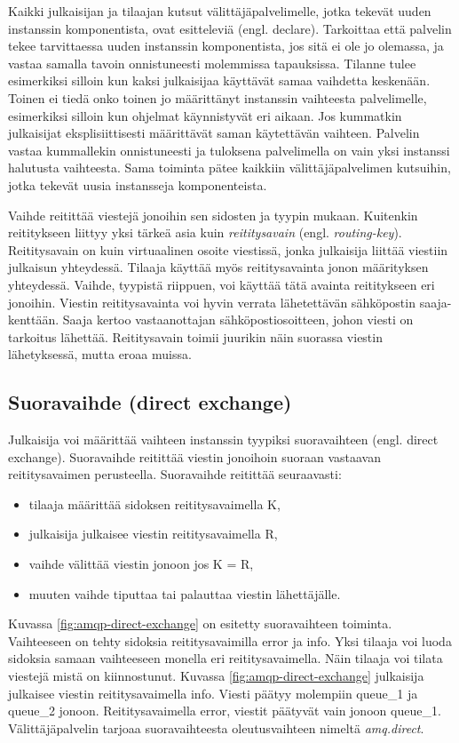 Kaikki julkaisijan ja tilaajan kutsut välittäjäpalvelimelle, jotka tekevät uuden instanssin komponentista, ovat esitteleviä (engl. declare). Tarkoittaa että palvelin tekee tarvittaessa uuden instanssin komponentista, jos sitä ei ole jo olemassa, ja vastaa samalla tavoin onnistuneesti molemmissa tapauksissa. Tilanne tulee esimerkiksi silloin kun kaksi julkaisijaa käyttävät samaa vaihdetta keskenään. Toinen ei tiedä onko toinen jo määrittänyt instanssin vaihteesta palvelimelle, esimerkiksi silloin kun ohjelmat käynnistyvät eri aikaan. Jos kummatkin julkaisijat eksplisiittisesti määrittävät saman käytettävän vaihteen. Palvelin vastaa kummallekin onnistuneesti ja tuloksena palvelimella on vain yksi instanssi halutusta vaihteesta. Sama toiminta pätee kaikkiin välittäjäpalvelimen kutsuihin, jotka tekevät uusia instansseja komponenteista.

Vaihde reitittää viestejä jonoihin sen sidosten ja tyypin mukaan. Kuitenkin reititykseen liittyy yksi tärkeä asia kuin \emph{reititysavain} (engl. \emph{routing-key}). Reititysavain on kuin virtuaalinen osoite viestissä, jonka julkaisija liittää viestiin julkaisun yhteydessä. Tilaaja käyttää myös reititysavainta jonon määrityksen yhteydessä. Vaihde, tyypistä riippuen, voi käyttää tätä avainta reititykseen eri jonoihin. Viestin reititysavainta voi hyvin verrata lähetettävän sähköpostin saaja-kenttään. Saaja kertoo vastaanottajan sähköpostiosoitteen, johon viesti on tarkoitus lähettää. Reititysavain toimii juurikin näin suorassa viestin lähetyksessä, mutta eroaa muissa.


\subsection{Suoravaihde (direct exchange)}
\label{ch:direct-exchange}
Julkaisija voi määrittää vaihteen instanssin tyypiksi suoravaihteen (engl. direct exchange). Suoravaihde reitittää viestin jonoihoin suoraan vastaavan reititysavaimen perusteella. Suoravaihde reitittää seuraavasti:
\begin{itemize}
	\item tilaaja määrittää sidoksen reititysavaimella K,
	\item julkaisija julkaisee viestin reititysavaimella R,
	\item vaihde välittää viestin jonoon jos K = R,
	\item muuten vaihde tiputtaa tai palauttaa viestin lähettäjälle.
\end{itemize}
Kuvassa \ref{fig:amqp-direct-exchange} on esitetty suoravaihteen toiminta. Vaihteeseen on tehty sidoksia reititysavaimilla error ja info. Yksi tilaaja voi luoda sidoksia samaan vaihteeseen monella eri reititysavaimella. Näin tilaaja voi tilata viestejä mistä on kiinnostunut. Kuvassa \ref{fig:amqp-direct-exchange} julkaisija julkaisee viestin reititysavaimella info. Viesti päätyy molempiin queue\_1 ja queue\_2 jonoon. Reititysavaimella error, viestit päätyvät vain jonoon queue\_1. Välittäjäpalvelin tarjoaa suoravaihteesta oleutusvaihteen nimeltä \emph{amq.direct}. \mbox{\cite[s.~27]{AMQP-specification}}

